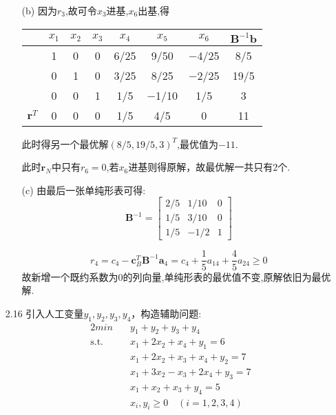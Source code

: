 \documentclass[UTF8]{ctexart}
\begin{document}
\begin{enumerate}
\begin{enumerate}
              \item[(b)] 因为$r_3$,故可令$x_3$进基,$x_6$出基,得
                    \begin{table}[ht]
                        \centering
                        \begin{tabular}{cccccccc}
                            \toprule
                            {}         & $x_1$ & $x_2$ & $x_3$ & $x_4$ & $x_5$ & $x_6$ & $\bm{B}^{-1}\bm{b}$ \\
                            \midrule
                            {}         & 1     & 0     & 0     & 6/25  & 9/50  & −4/25 & 8/5                 \\
                            {}         & 0     & 1     & 0     & 3/25  & 8/25  & −2/25 & 19/5                \\
                            {}         & 0     & 0     & 1     & 1/5   & −1/10 & 1/5   & 3                   \\
                            $\bm{r}^T$ & 0     & 0     & 0     & 1/5   & 4/5   & 0     & 11                  \\
                            \bottomrule
                        \end{tabular}
                    \end{table}

                    此时得另一个最优解$(8/5,19/5,3)^T$,最优值为$-11$.

                    此时$\bm{r}_N$中只有$r_6=0$,若$x_6$进基则得原解，故最优解一共只有2个.

              \item[(c)]
                    由最后一张单纯形表可得:
                    \[\bm{B}^{-1}=\begin{bmatrix}
                            2/5 & 1/10 & 0 \\
                            1/5 & 3/10 & 0 \\
                            1/5 & -1/2 & 1
                        \end{bmatrix}\]

                    \[r_4=c_4-\bm{c}_B^T\bm{B}^{-1}\bm{a}_4=c_4+\dfrac{1}{5}a_{14}+\dfrac{4}{5}a_{24} \geq 0\]
                    故新增一个既约系数为0的列向量,单纯形表的最优值不变,原解依旧为最优解.
          \end{enumerate}

          \newpage
    \item[2.16] 引入人工变量$y_1,y_2,y_3,y_4$，构造辅助问题:
          \begin{alignat}{2}
              min \quad & y_1+y_2+y_3+y_4 \nonumber        \\
              \mbox{s.t.}\quad
                        & x_1+2x_2+x_4+y_1=6\nonumber      \\
                        & x_1+2x_2+x_3+x_4+y_2=7\nonumber  \\
                        & x_1+3x_2-x_3+2x_4+y_3=7\nonumber \\
                        & x_1+x_2+x_3+y_4=5\nonumber       \\
                        & x_i,y_i\geq 0\quad(i=1,2,3,4)
          \end{alignat}


\end{enumerate}
\end{document}
